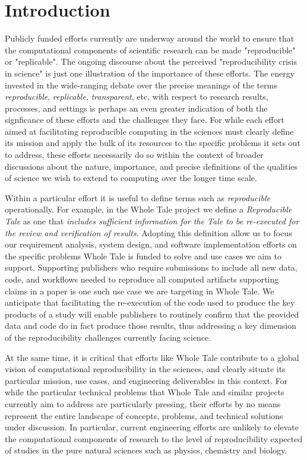 
\section{Introduction}

Publicly funded efforts currently are underway around the world to 
	ensure that the computational components of scientific research
	can be made "reproducible" or "replicable".
The ongoing discourse about the perceived "reproducibility crisis in science"
	is just one illustration of the importance of these efforts.
The energy invested in the wide-ranging debate over the precise meanings of the 
	terms \emph{reproducible}, \emph{replicable}, \emph{transparent}, etc, with 
	respect to research results, processes, and settings is perhaps an even greater indication of 
	both the signficance of these efforts and the challenges they face.
For while each effort aimed at facilitating reproducible computing in the
	sciences must clearly define its mission and apply the bulk of its resources
	to the specific problems it sets out to address, these efforts necessarily do
	so within the context of broader discussions about the nature, importance,
	and precise definitions of the qualities of science we wish to extend to computing
	over the longer time scale.

Within a particular effort it is useful to define terms such as \emph{reproducible} operationally.
For example, in the Whole Tale project we define a \emph{Reproducible Tale} as one 
	that \emph{includes sufficient information for the Tale to be re-executed for the review 
	and verification of results}.
Adopting this definition allow us to focus our requirement analysis, system design,
	and software implementation efforts on the specific problems Whole Tale is funded to solve
	and use cases we aim to support.
Supporting publishers who require submissions to include all new data, 
	code, and workflows needed to reproduce all computed artifacts supporting
	claims in a paper is one such use case we are targeting in Whole Tale.
We anticipate that facilitating the re-execution of the code used to produce
	the key products of a study will enable publishers to routinely confirm that
	the provided data and code do in fact produce those results, thus addressing
	a key dimension of the reproducibility challenges currently facing science.

At the same time, it is critical that efforts like Whole Tale contribute to a global 
	vision of computational reproducibility in the sciences, and clearly situate 
	its particular mission, use cases, and engineering deliverables in this context.
For while the particular technical problems that Whole Tale and similar projects currently
	aim to address are particularly pressing, their efforts by no means
	represent the entire landscape of concepts, problems, and technical solutions
	under discussion.
In particular, current engineering efforts are unlikely to elevate the computational components
	of research to the level of reproducibility expected of studies in the
	pure natural sciences such as physics, chemistry and biology.

